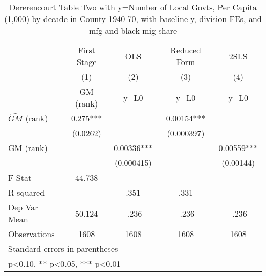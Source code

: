 \begin{table}[htbp]\centering
\def\sym#1{\ifmmode^{#1}\else\(^{#1}\)\fi}
\caption{Dererencourt Table Two with y=Number of Local Govts, Per Capita (1,000) by decade in County 1940-70, with baseline y, division FEs, and mfg and black mig share}
\begin{tabular}{l*{4}{c}}
\toprule
                    & First Stage   &         OLS   &Reduced Form   &        2SLS   \\
                    &\multicolumn{1}{c}{(1)}&\multicolumn{1}{c}{(2)}&\multicolumn{1}{c}{(3)}&\multicolumn{1}{c}{(4)}\\
                    &\multicolumn{1}{c}{GM  (rank)}&\multicolumn{1}{c}{y\_L0}&\multicolumn{1}{c}{y\_L0}&\multicolumn{1}{c}{y\_L0}\\
\midrule
$\hat{GM}$ (rank)   &       0.275***&               &     0.00154***&               \\
                    &    (0.0262)   &               &  (0.000397)   &               \\
\addlinespace
GM  (rank)          &               &     0.00336***&               &     0.00559***\\
                    &               &  (0.000415)   &               &   (0.00144)   \\
\midrule
F-Stat              &      44.738   &               &               &               \\
R-squared           &               &        .351   &        .331   &               \\
Dep Var Mean        &      50.124   &       -.236   &       -.236   &       -.236   \\
Observations        &        1608   &        1608   &        1608   &        1608   \\
\bottomrule
\multicolumn{5}{l}{\footnotesize Standard errors in parentheses}\\
\multicolumn{5}{l}{\footnotesize * p<0.10, ** p<0.05, *** p<0.01}\\
\end{tabular}
\end{table}
